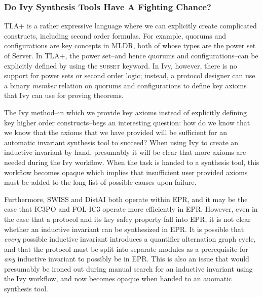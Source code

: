 \documentclass[12pt]{article}
\newcommand{\tla}[1]{{\small\scshape #1}}
\begin{document}
\subsubsection{Do Ivy Synthesis Tools Have A Fighting Chance?}

TLA+ is a rather expressive language where we can explicitly create complicated constructs, including second order formulas.  For example, quorums and configurations are key concepts in MLDR, both of whose types are the power set of Server.  In TLA+, the power set--and hence quorums and configurations--can be explicitly defined by using the \tla{subset} keyword.  In Ivy, however, there is no support for power sets or second order logic; instead, a protocol designer can use a binary \textit{member} relation on quorums and configurations to define key axioms that Ivy can use for proving theorems.

The Ivy method--in which we provide key axioms instead of explicitly defining key higher order constructs--begs an interesting question: how do we know that we know that the axioms that we have provided will be sufficient for an automatic invariant synthesis tool to succeed?  When using Ivy to create an inductive invariant by hand, presumably it will be clear that more axioms are needed during the Ivy workflow.  When the task is handed to a synthesis tool, this workflow becomes opaque which implies that insufficient user provided axioms must be added to the long list of possible causes upon failure.

Furthermore, SWISS and DistAI both operate within EPR, and it may be the case that IC3PO and FOL-IC3 operate more efficiently in EPR.  However, even in the case that a protocol and its key safey property fall into EPR, it is not clear whether an inductive invariant can be synthesized in EPR.  It is possible that \textit{every} possible inductive invariant introduces a quantifier alternation graph cycle, and that the protocol must be split into separate modules as a prerequisite for \textit{any} inductive invariant to possibly be in EPR.  This is also an issue that would presumably be ironed out during manual search for an inductive invariant using the Ivy workflow, and now becomes opaque when handed to an auomatic synthesis tool.




\end{document}
